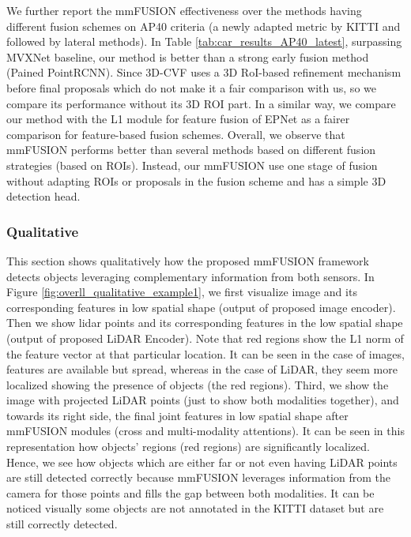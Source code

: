 \documentclass[10pt,twocolumn,letterpaper]{article}
\begin{document}
We further report the mmFUSION effectiveness over the methods having different fusion schemes on AP40 criteria (a newly adapted metric by KITTI and followed by lateral methods). In Table \ref{tab:car_results_AP40_latest}, surpassing MVXNet baseline, our method is better than a strong early fusion method (Pained PointRCNN). Since 3D-CVF uses a 3D RoI-based refinement mechanism before final proposals which do not make it a fair comparison with us, so we compare its performance without its 3D ROI part. In a similar way, we compare our method with the L1 module for feature fusion of EPNet as a fairer comparison for feature-based fusion schemes. Overall, we observe that mmFUSION performs better than several methods based on different fusion strategies (based on ROIs). Instead, our mmFUSION use one stage of fusion without adapting ROIs or proposals in the fusion scheme and has a simple 3D detection head. 

\subsubsection{Qualitative}

This section shows qualitatively how the proposed mmFUSION framework detects objects leveraging complementary information from both sensors. In Figure \ref{fig:overll_qualitative_example1}, we first visualize image and its corresponding features in low spatial shape (output of proposed image encoder). Then we show lidar points and its corresponding features in the low spatial shape (output of proposed LiDAR Encoder). Note that red regions show the L1 norm  of the feature vector at that particular location. It can be seen in the case of images, features are available but spread, whereas in the case of LiDAR, they seem more localized showing the presence of objects (the red regions). Third, we show the image with projected LiDAR points (just to show both modalities together), and towards its right side, the final joint features in low spatial shape after mmFUSION modules (cross and multi-modality attentions). It can be seen in this representation how objects' regions (red regions) are significantly localized. Hence, we see how objects which are either far or not even having LiDAR points are still detected correctly because mmFUSION leverages information from the camera for those points and fills the gap between both modalities. It can be noticed visually some objects are not annotated in the KITTI dataset but are still correctly detected.
\end{document}
